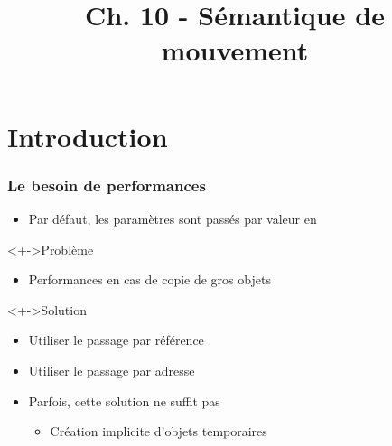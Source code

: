 


\title{Ch. 10 - Sémantique de mouvement}




\section{Introduction}

\begin{frame}
\frametitle{Le besoin de performances}
\begin{itemize}[<+->]
\item Par défaut, les paramètres sont passés par valeur en \cpp
\end{itemize}
\begin{alertblock}<+->{Problème}
	\begin{itemize}[<+->]
	\item Performances en cas de copie de gros objets
	\end{itemize}
\end{alertblock}
\begin{block}<+->{Solution}
	\begin{itemize}[<+->]
	\item Utiliser le passage par référence
	\item Utiliser le passage par adresse
	\end{itemize}
\end{block}
\begin{itemize}[<+->]
\item Parfois, cette solution ne suffit pas
	\begin{itemize}
	\item Création implicite d'objets temporaires
	\end{itemize}
\end{itemize}
\end{frame}

